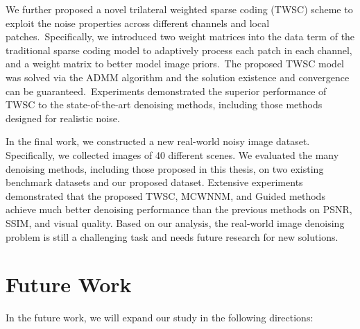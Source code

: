 We further proposed a novel trilateral weighted sparse coding (TWSC) scheme to exploit the noise properties across different channels and local patches.\ Specifically, we introduced two weight matrices into the data term of the traditional sparse coding model to adaptively process each patch in each channel, and a weight matrix to better model image priors.\ The proposed TWSC model was solved via the ADMM algorithm and the solution existence and convergence can be guaranteed.\ Experiments demonstrated the superior performance of TWSC to the state-of-the-art denoising methods, including those methods designed for realistic noise.

In the final work, we constructed a new real-world noisy image dataset. Specifically, we collected images of 40 different scenes. We evaluated the many denoising methods, including those proposed in this thesis, on two existing benchmark datasets and our proposed dataset. Extensive experiments demonstrated that the proposed TWSC, MCWNNM, and Guided methods achieve much better denoising performance than the previous methods on PSNR, SSIM, and visual quality. Based on our analysis, the real-world image denoising problem is still a challenging task and needs future research for new solutions.

\section{Future Work}
\label{sec:conclusions:future}

In the future work, we will expand our study in the following directions:


